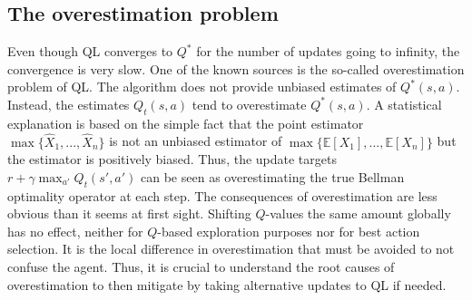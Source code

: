 \documentclass{article}
\theoremstyle{plain}
\theoremstyle{definition}
\theoremstyle{remark}
\begin{document}


\subsection{The overestimation problem}\label{sec:overestimationproblem}
Even though QL converges to $Q^*$ for the number of updates going to infinity, the convergence is very slow. One of the known sources is the so-called overestimation problem of QL. The algorithm does not provide unbiased estimates of $Q^*(s,a)$. Instead, the estimates $Q_t(s,a)$ tend to overestimate $Q^*(s,a)$. A statistical explanation is based on the simple fact that the point estimator $\max\{\hat X_1,...,\hat X_n\}$ is not an unbiased estimator of $\max\{\mathbb E[X_1],...,\mathbb E[X_n]\}$ but the estimator is positively biased. Thus, the update targets $r+\gamma \max_{a'} Q_{t}(s',a')$ can be seen as overestimating the true Bellman optimality operator at each step. The consequences of overestimation are less obvious than it seems at first sight. Shifting $Q$-values the same amount globally has no effect, neither for $Q$-based exploration purposes nor for best action selection. It is the local difference in overestimation that must be avoided to not confuse the agent. Thus, it is crucial to understand the root causes of overestimation to then mitigate by taking alternative updates to QL if needed.
\end{document}
